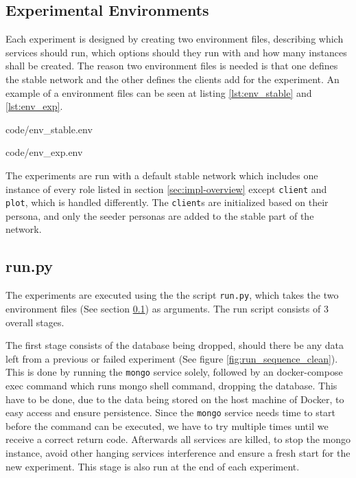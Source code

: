 \subsection{Experimental Environments}
\label{sec:experiment_env}
Each experiment is designed by creating two environment files, describing which services should run, which options should they run with and how many instances shall be created. The reason two environment files is needed is that one defines the stable network and the other defines the clients add for the experiment. An example of a environment files can be seen at listing \ref{lst:env_stable} and \ref{lst:env_exp}.

\noindent\begin{minipage}[t]{.35\textwidth}

                {code/env_stable.env}
\end{minipage}
\hfill
\begin{minipage}[t]{.52\textwidth}

                {code/env_exp.env}
\end{minipage}\bigskip

The experiments are run with a default stable network which includes one instance of every role listed in section \ref{sec:impl-overview} except \texttt{client} and \texttt{plot}, which is handled differently. The \texttt{client}s are initialized based on their persona, and only the seeder personas are added to the stable part of the network.

\subsection{run.py}
\label{sec:experiment_run}
The experiments are executed using the the script \texttt{run.py}, which takes the two environment files (See section \ref{sec:experiment_env}) as arguments. The run script consists of 3 overall stages.

The first stage consists of the database being dropped, should there be any data left from a previous or failed experiment (See figure \ref{fig:run_sequence_clean}). This is done by running the \texttt{mongo} service solely, followed by an docker-compose exec command which runs mongo shell command, dropping the database. This have to be done, due to the data being stored on the host machine of Docker, to easy access and ensure persistence. Since the \texttt{mongo} service needs time to start before the command can be executed, we have to try multiple times until  we receive a correct return code. Afterwards all services are killed, to stop the mongo instance, avoid other hanging services interference and ensure a fresh start for the new experiment. This stage is also run at the end of each experiment.


